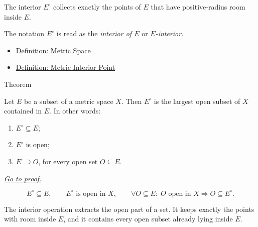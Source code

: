 \begin{remark*}[Interpretation]
The interior \(E^\circ\) collects exactly the points of \(E\) that have
positive-radius room inside \(E\).
\end{remark*}

\begin{remark*}[Notation]
The notation \(E^\circ\) is read as the \emph{interior of \(E\)} or
\emph{\(E\)-interior}.
\end{remark*}

\begin{dependencies}
\begin{itemize}
  \item \hyperref[def:metric-space]{Definition: Metric Space}
  \item \hyperref[def:metric-interior-point]{Definition: Metric Interior Point}
\end{itemize}
\end{dependencies}

\begin{theorembox}{Theorem}
\begin{theorem}
\label{thm:metric-interior-largest-open-subset}
Let \(E\) be a subset of a metric space \(X\).  Then \(E^\circ\) is the
largest open subset of \(X\) contained in \(E\).  In other words:
\begin{enumerate}
  \item \(E^\circ\subseteq E\);
  \item \(E^\circ\) is open;
  \item \(E^\circ\supseteq O\), for every open set \(O\subseteq E\).
\end{enumerate}

\smallskip
\noindent
\hyperref[prf:metric-interior-largest-open-subset]{\textit{Go to proof.}}
\end{theorem}
\end{theorembox}

\begin{remark*}
\[
E^\circ\subseteq E,
\qquad
E^\circ\text{ is open in }X,
\qquad
\forall O\subseteq E{:}\;
O\text{ open in }X\Longrightarrow O\subseteq E^\circ.
\]
\end{remark*}

\begin{remark*}[Interpretation]
The interior operation extracts the open part of a set.  It keeps exactly the
points with room inside \(E\), and it contains every open subset already lying
inside \(E\).
\end{remark*}

